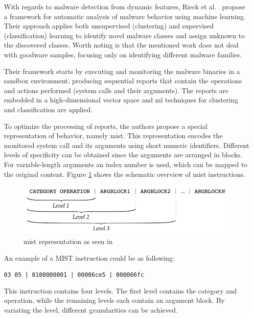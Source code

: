 \medskip

With regards to malware detection from dynamic features, Rieck et al.~\cite{rieck:dynamic} propose a framework for automatic analysis of malware behavior using machine learning.
Their approach applies both unsupervised (clustering) and supervised (classification) learning to identify novel malware classes and assign unknown to the discovered classes.
Worth noting is that the mentioned work does not deal with goodware samples, focusing only on identifying different malware families.

Their framework starts by executing and monitoring the malware binaries in a sandbox environment, producing sequential reports that contain the operations and actions performed (system calls and their arguments).
The reports are embedded in a high-dimensional vector space and \gls{ml} techniques for clustering and classification are applied.

To optimize the processing of reports, the authors propose a special representation of behavior, namely \gls{mist}.
This representation encodes the monitored system call and its arguments using short numeric identifiers.
Different levels of specificity can be obtained since the arguments are arranged in blocks.
For variable-length arguments an index number is used, which can be mapped to the original content. Figure \ref{fig:mist} shows the schematic overview of \gls{mist} instructions.

\begin{figure}[!htb]
	\centering
	\includegraphics[width=0.7\columnwidth]{Figures/mist.png}
	\caption{\gls{mist} representation as seen in \cite{rieck:dynamic}}
	\label{fig:mist}
\end{figure}

An example of a MIST instruction could be as following:

\begin{center}\texttt{03 05 | 0100000001 | 00006ce5 | 000066fc}\end{center}

This instruction contains four levels.
The first level contains the category and operation, while the remaining levels each contain an argument block.
By variating the level, different granularities can be achieved.

